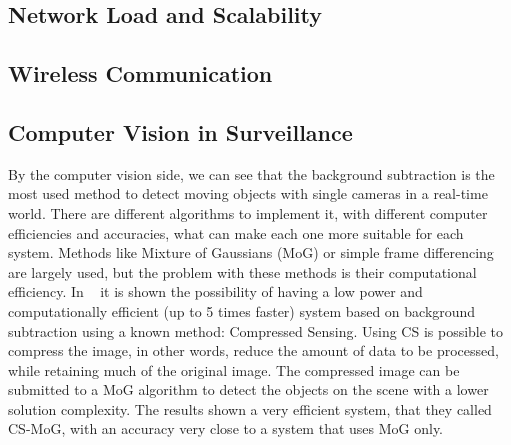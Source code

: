 \documentclass[journal,transmag]{IEEEtran}
\begin{document}
\subsection{Network Load and Scalability}
\subsection{Wireless Communication}
\subsection{Computer Vision in Surveillance}
By the computer vision side, we can see that the background subtraction is the most used method to detect moving objects with single cameras in a 
real-time world. There are different algorithms to implement it, with different computer efficiencies and accuracies, what can make each one more
suitable for each system. Methods like Mixture of Gaussians (MoG) or simple frame differencing are largely used, but the problem with these methods is
their computational efficiency. In ~\cite{CS-MoG} it is shown the possibility of having a low power and computationally efficient (up to 5 times
faster) system based on background subtraction using a known method: Compressed Sensing. Using CS is possible to compress the image, in other words,
reduce the amount of data to be processed, while retaining much of the original image. The compressed image can be submitted to a MoG algorithm to
detect the objects on the scene with a lower solution complexity. The results shown a very efficient system, that they called CS-MoG, with an accuracy
very close to a system that uses MoG only.
\end{document}
